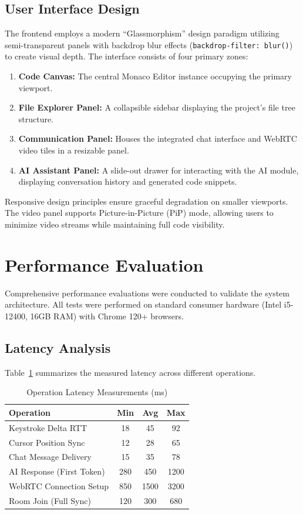 \documentclass[conference]{IEEEtran}
\begin{document}
\subsection{User Interface Design}
The frontend employs a modern ``Glassmorphism'' design paradigm utilizing semi-transparent panels with backdrop blur effects (\texttt{backdrop-filter: blur()}) to create visual depth. The interface consists of four primary zones:
\begin{enumerate}
    \item \textbf{Code Canvas:} The central Monaco Editor instance occupying the primary viewport.
    \item \textbf{File Explorer Panel:} A collapsible sidebar displaying the project's file tree structure.
    \item \textbf{Communication Panel:} Houses the integrated chat interface and WebRTC video tiles in a resizable panel.
    \item \textbf{AI Assistant Panel:} A slide-out drawer for interacting with the AI module, displaying conversation history and generated code snippets.
\end{enumerate}

Responsive design principles ensure graceful degradation on smaller viewports. The video panel supports Picture-in-Picture (PiP) mode, allowing users to minimize video streams while maintaining full code visibility.

\section{Performance Evaluation}
Comprehensive performance evaluations were conducted to validate the system architecture. All tests were performed on standard consumer hardware (Intel i5-12400, 16GB RAM) with Chrome 120+ browsers.

\subsection{Latency Analysis}
Table~\ref{tab:latency} summarizes the measured latency across different operations.

\begin{table}[H]
\centering
\caption{Operation Latency Measurements (ms)}
\label{tab:latency}
\renewcommand{\arraystretch}{1.2}
\begin{tabular}{|l|c|c|c|}
\hline
\textbf{Operation} & \textbf{Min} & \textbf{Avg} & \textbf{Max} \\
\hline
Keystroke Delta RTT & 18 & 45 & 92 \\
\hline
Cursor Position Sync & 12 & 28 & 65 \\
\hline
Chat Message Delivery & 15 & 35 & 78 \\
\hline
AI Response (First Token) & 280 & 450 & 1200 \\
\hline
WebRTC Connection Setup & 850 & 1500 & 3200 \\
\hline
Room Join (Full Sync) & 120 & 300 & 680 \\
\hline
\end{tabular}
\end{table}
\end{document}
